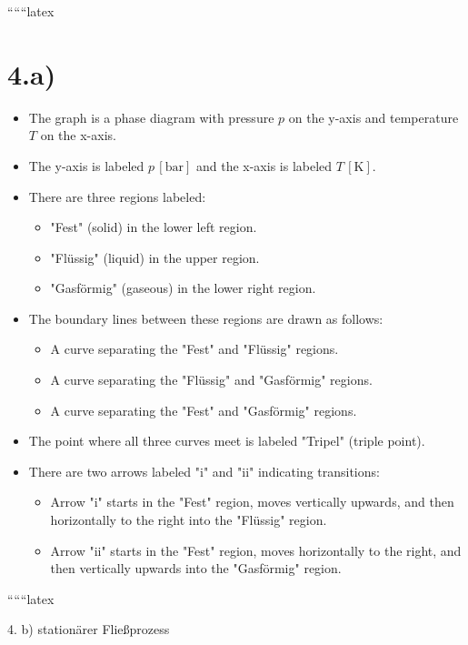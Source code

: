 
``````latex


\section*{4.a)}

\begin{itemize}
    \item The graph is a phase diagram with pressure \( p \) on the y-axis and temperature \( T \) on the x-axis.
    \item The y-axis is labeled \( p \, [\text{bar}] \) and the x-axis is labeled \( T \, [\text{K}] \).
    \item There are three regions labeled:
    \begin{itemize}
        \item "Fest" (solid) in the lower left region.
        \item "Flüssig" (liquid) in the upper region.
        \item "Gasförmig" (gaseous) in the lower right region.
    \end{itemize}
    \item The boundary lines between these regions are drawn as follows:
    \begin{itemize}
        \item A curve separating the "Fest" and "Flüssig" regions.
        \item A curve separating the "Flüssig" and "Gasförmig" regions.
        \item A curve separating the "Fest" and "Gasförmig" regions.
    \end{itemize}
    \item The point where all three curves meet is labeled "Tripel" (triple point).
    \item There are two arrows labeled "i" and "ii" indicating transitions:
    \begin{itemize}
        \item Arrow "i" starts in the "Fest" region, moves vertically upwards, and then horizontally to the right into the "Flüssig" region.
        \item Arrow "ii" starts in the "Fest" region, moves horizontally to the right, and then vertically upwards into the "Gasförmig" region.
    \end{itemize}
\end{itemize}

``````latex


4. b) stationärer Fließprozess

